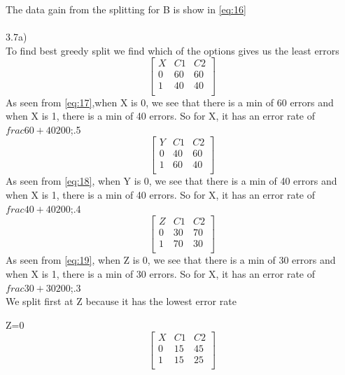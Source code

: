 \documentclass[12pt,english]{article}
\begin{document}
The data gain from the splitting for B is show in \eqref{eq:16}\\ \\
3.7a)\\
To find best greedy split we find which of the options gives us the least errors
\begin{equation*}\tag{1}\label{eq:17}
\begin{bmatrix} X & C1 & C2 \\0 & 60 &  60 \\1 & 40 &  40 \\ \end{bmatrix}
\end{equation*}
As seen from \eqref{eq:17},when X is 0, we see that there is a min of 60 errors and when X is 1, there is a min of 40 errors. So for X, it has an error rate of $frac{60+40}{200}$;.5\\
\begin{equation*}\tag{2}\label{eq:18}
\begin{bmatrix} Y & C1 & C2 \\0 & 40 &  60 \\1 & 60 &  40 \\ \end{bmatrix}
\end{equation*}
As seen from \eqref{eq:18}, when Y is 0, we see that there is a min of 40 errors and when X is 1, there is a min of 40 errors. So for X, it has an error rate of $frac{40+40}{200}$;.4\\
\begin{equation*}\tag{3}\label{eq:19}
\begin{bmatrix} Z & C1 & C2 \\0 & 30 &  70 \\1 & 70 &  30 \\ \end{bmatrix}
\end{equation*}
As seen from \eqref{eq:19}, when Z is 0, we see that there is a min of 30 errors and when X is 1, there is a min of 30 errors. So for X, it has an error rate of $frac{30+30}{200}$;.3\\
We split first at Z because it has the lowest error rate\par
Z=0\\
\begin{equation*}\tag{1}\label{eq:20}
\begin{bmatrix} X & C1 & C2 \\0 & 15 &  45 \\1 & 15 &  25 \\ \end{bmatrix}
\end{equation*}
\end{document}
